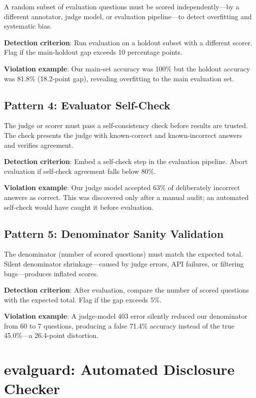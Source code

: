 \documentclass[11pt]{article}
\begin{document}
A random subset of evaluation questions must be scored independently---by a different annotator, judge model, or evaluation pipeline---to detect overfitting and systematic bias.

\textbf{Detection criterion}: Run evaluation on a holdout subset with a different scorer. Flag if the main-holdout gap exceeds 10 percentage points.

\textbf{Violation example}: Our main-set accuracy was 100\% but the holdout accuracy was 81.8\% (18.2-point gap), revealing overfitting to the main evaluation set.

\subsection{Pattern 4: Evaluator Self-Check}

The judge or scorer must pass a self-consistency check before results are trusted. The check presents the judge with known-correct and known-incorrect answers and verifies agreement.

\textbf{Detection criterion}: Embed a self-check step in the evaluation pipeline. Abort evaluation if self-check agreement falls below 80\%.

\textbf{Violation example}: Our judge model accepted 63\% of deliberately incorrect answers as correct. This was discovered only after a manual audit; an automated self-check would have caught it before evaluation.

\subsection{Pattern 5: Denominator Sanity Validation}

The denominator (number of scored questions) must match the expected total. Silent denominator shrinkage---caused by judge errors, API failures, or filtering bugs---produces inflated scores.

\textbf{Detection criterion}: After evaluation, compare the number of scored questions with the expected total. Flag if the gap exceeds 5\%.

\textbf{Violation example}: A judge-model 403 error silently reduced our denominator from 60 to 7 questions, producing a false 71.4\% accuracy instead of the true 45.0\%---a 26.4-point distortion.

\section{evalguard: Automated Disclosure Checker}
\label{sec:evalguard}
\end{document}
